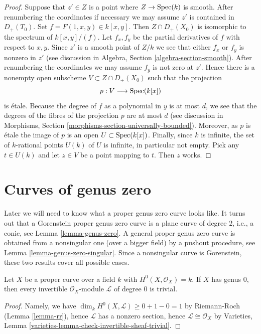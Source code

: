 \begin{proof}
Suppose that $z' \in Z$ is a point where $Z \to \mathop{\mathrm{Spec}}(k)$ is smooth.
After renumbering the coordinates if necessary we may assume
$z'$ is contained in $D_+(T_0)$. Set $f = F(1, x, y) \in k[x, y]$.
Then $Z \cap D_+(X_0)$ is isomorphic to the spectrum of $k[x, y]/(f)$.
Let $f_x, f_y$ be the partial derivatives of $f$ with respect to
$x, y$. Since $z'$ is a smooth point of $Z/k$ we see that either
$f_x$ or $f_y$ is nonzero in $z'$ (see discussion in
Algebra, Section \ref{algebra-section-smooth}).
After renumbering the coordinates
we may assume $f_y$ is not zero at $z'$. Hence there is a nonempty
open subscheme $V \subset Z \cap D_{+}(X_0)$ such that the
projection
$$
p : V \longrightarrow \mathop{\mathrm{Spec}}(k[x])
$$
is \'etale. Because the degree of $f$ as a polynomial in $y$
is at most $d$, we see that the degrees of the fibres of the
projection $p$ are at most $d$ (see discussion in
Morphisms, Section \ref{morphisms-section-universally-bounded}).
Moreover, as $p$ is \'etale
the image of $p$ is an open $U \subset \mathop{\mathrm{Spec}}(k[x])$.
Finally, since $k$ is infinite, the set of $k$-rational points
$U(k)$ of $U$ is infinite, in particular not empty. Pick any
$t \in U(k)$ and let $z \in V$ be a point mapping to $t$.
Then $z$ works.
\end{proof}





\section{Curves of genus zero}
\label{section-genus-zero}

\noindent
Later we will need to know what a proper genus zero curve looks like.
It turns out that a Gorenstein proper genus zero curve is a plane
curve of degree $2$, i.e., a conic, see Lemma \ref{lemma-genus-zero}.
A general proper genus zero curve is obtained from a nonsingular one
(over a bigger field) by a pushout procedure, see
Lemma \ref{lemma-genus-zero-singular}.
Since a nonsingular curve is Gorenstein, these two results
cover all possible cases.

\begin{lemma}
\label{lemma-genus-zero-pic}
Let $X$ be a proper curve over a field $k$ with $H^0(X, \mathcal{O}_X) = k$.
If $X$ has genus $0$, then every invertible $\mathcal{O}_X$-module
$\mathcal{L}$ of degree $0$ is trivial.
\end{lemma}

\begin{proof}
Namely, we have $\dim_k H^0(X, \mathcal{L}) \geq 0 + 1 - 0 = 1$
by Riemann-Roch (Lemma \ref{lemma-rr}), hence $\mathcal{L}$ has a
nonzero section, hence $\mathcal{L} \cong \mathcal{O}_X$ by
Varieties, Lemma \ref{varieties-lemma-check-invertible-sheaf-trivial}.
\end{proof}

